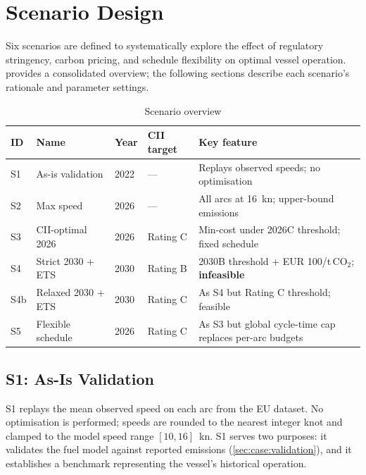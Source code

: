 \section{Scenario Design}
\label{ch:scenarios}

Six scenarios are defined to systematically explore the effect of
regulatory stringency, carbon pricing, and schedule flexibility on
optimal vessel operation.  provides
a consolidated overview; the following sections describe each scenario's
rationale and parameter settings.

\begin{table}[h]
\centering
\caption{Scenario overview}
\label{tab:scenarios_overview}
\begin{tabular}{llllp{4.5cm}}
  \toprule
  ID & Name & Year & CII target & Key feature \\
  \midrule
  S1  & As-is validation     & 2022 & ---    & Replays observed speeds; no optimisation \\
  S2  & Max speed            & 2026 & ---    & All arcs at 16~kn; upper-bound emissions \\
  S3  & CII-optimal 2026     & 2026 & Rating C & Min-cost under 2026C threshold; fixed schedule \\
  S4  & Strict 2030 + ETS    & 2030 & Rating B & 2030B threshold + EUR 100/t\,CO$_2$; \textbf{infeasible} \\
  S4b & Relaxed 2030 + ETS   & 2030 & Rating C & As S4 but Rating C threshold; feasible \\
  S5  & Flexible schedule    & 2026 & Rating C & As S3 but global cycle-time cap replaces per-arc budgets \\
  \bottomrule
\end{tabular}
\end{table}

\subsection{S1: As-Is Validation}
\label{sec:scen:s1}

S1 replays the mean observed speed on each arc from the EU \MRV{}
dataset. No optimisation is performed; speeds are rounded to the nearest
integer knot and clamped to the model speed range $[10,16]$~kn. S1
serves two purposes: it validates the fuel model against reported
emissions (\cref{sec:case:validation}), and it establishes a
benchmark representing the vessel's historical operation.

